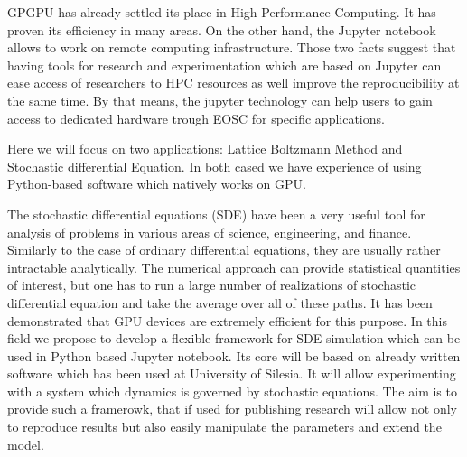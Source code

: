 \begin{task}[
  title=Application: Reproducible research based on GPU,
  id=application-gpu,
  lead=SIL,
  PM=12,
  wphases={4-36},
  partners={}
]


GPGPU  has already settled its place in High-Performance Computing. It has proven its efficiency in many areas. On the other hand, the Jupyter notebook allows to work on remote computing infrastructure. Those two facts suggest that having tools for research and experimentation which are based on Jupyter can ease access of researchers  to HPC resources as well improve the reproducibility at the same time. By that means, the jupyter technology can help users to gain access to dedicated hardware trough EOSC for specific applications.

Here we will focus on two applications: Lattice Boltzmann Method and Stochastic differential Equation. In both cased we have experience of using Python-based software which natively works on GPU. 

The stochastic differential equations (SDE) have been a very useful tool for analysis of problems in various areas of science, engineering, and finance. Similarly to the case of ordinary differential equations, they are usually rather intractable analytically. The numerical approach can provide  statistical quantities of interest, but one has to run a large number of realizations of stochastic differential equation and take the average over all of these paths. It has been demonstrated that GPU devices are extremely efficient for this purpose\cite{januszewski2010accelerating,spiechowicz2015gpu}. In this field we propose to develop a flexible framework for SDE simulation which can be used in Python based Jupyter notebook. Its core will be based on already written software which has been used at University of Silesia. 
It will allow experimenting with a system which dynamics is governed by stochastic equations. The aim is to provide such a framerowk, that if used for publishing research will allow not only to reproduce results but also easily manipulate the parameters and extend the model.


\end{task}
